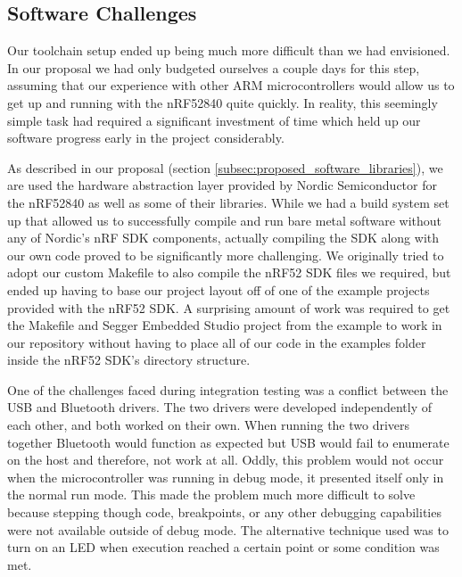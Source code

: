 \subsection{Software Challenges}

Our toolchain setup ended up being much more difficult than we had envisioned.
In our proposal we had only budgeted ourselves a couple days for this step,
assuming that our experience with other ARM microcontrollers would allow us to
get up and running with the nRF52840 quite quickly. In reality, this seemingly
simple task had required a significant investment of time which held up our
software progress early in the project considerably.

As described in our proposal (section \ref{subsec:proposed_software_libraries}),
we are used the hardware abstraction layer provided by Nordic
Semiconductor for the nRF52840 as well as some of their libraries. While we had
a build system set up that allowed us to successfully compile and run bare metal
software without any of Nordic's nRF SDK components, actually compiling the SDK 
along with our own code proved to be significantly more challenging. We 
originally tried to adopt our custom Makefile to also compile the nRF52 SDK files 
we required, but ended up having to base our project layout off of one of the 
example projects provided with the nRF52 SDK. A surprising amount of work was 
required to get the Makefile and Segger Embedded Studio project from the example 
to work in our repository without having to place all of our code in the examples 
folder inside the nRF52 SDK's directory structure.

One of the challenges faced during integration testing was a conflict between 
the USB and Bluetooth drivers. The two drivers were developed independently of
each other, and both worked on their own. When running the two drivers together
Bluetooth would function as expected but USB would fail to enumerate on the host
and therefore, not work at all. Oddly, this problem would not occur when the 
microcontroller was running in debug mode, it presented itself only in the 
normal run mode. This made the problem much more difficult to solve because
stepping though code, breakpoints, or any other debugging capabilities were not
available outside of debug mode. The alternative technique used was to turn on 
an LED when execution reached a certain point or some condition was met. 

